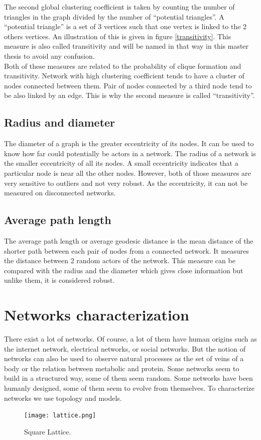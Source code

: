 \documentclass[a4paper, 12pt]{report}
\begin{document}
The second global clustering coefficient is taken by counting the number of triangles in the graph divided by the number of ``potential triangles''. A ``potential triangle'' is a set of 3 vertices such that one vertex is linked to the 2 others vertices. An illustration of this is given in figure \ref{transitivity}. This measure is also called transitivity and will be named in that way in this master thesis to avoid any confusion. \\

Both of these measures are related to the probability of clique formation and transitivity. Network with high clustering coefficient tends to have a cluster of nodes connected between them. Pair of nodes connected by a third node tend to be also linked by an edge. This is why the second measure is called ``transitivity''.\\

\subsection{Radius and diameter}
The diameter of a graph is the greater eccentricity of its nodes. It can be used to know how far could potentially be actors in a network. The radius of a network is the smaller eccentricity of all its nodes. A small eccentricity indicates that a particular node is near all the other nodes. However, both of those measures are very sensitive to outliers and not very robust. As the eccentricity, it can not be measured on disconnected networks.

\subsection{Average path length}
The average path length \citep{path_length} or average geodesic distance is the mean distance of the shorter path between each pair of nodes from a connected network. It measures the distance between 2 random actors of the network. This measure can be compared with the radius and the diameter which gives close information but unlike them, it is considered robust.

\section{Networks characterization}
There exist a lot of networks. Of course, a lot of them have human origins such as the internet network, electrical networks, or social networks. But the notion of networks can also be used to observe natural processes as the set of veins of a body or the relation between metabolic and protein. Some networks seem to build in a structured way, some of them seem random. Some networks have been humanly designed, some of them seem to evolve from themselves. To characterize networks we use topology and models.\\
\begin{figure}
\centering
\texttt{[image: lattice.png]}
\caption{Square Lattice. \citep{complex_networks} }
\label{lattice}
\end{figure}
\end{document}

